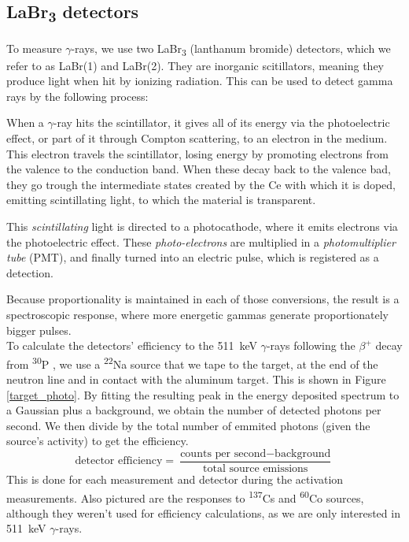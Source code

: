 \documentclass[a4paper,12pt]{report}
\newcommand{\Piso}{\textsuperscript{30}P }
\newcommand{\Na}{\textsuperscript{22}Na }
\begin{document}
\subsection{LaBr\textsubscript{3} detectors}
To measure $\gamma$-rays, we use two LaBr\textsubscript{3} (lanthanum bromide) detectors, which we refer to as LaBr(1) and LaBr(2).
They are inorganic scitillators, meaning they produce light when hit by ionizing radiation.
This can be used to detect gamma rays by the following process:

When a $\gamma$-ray hits the scintillator, it gives all of its energy via the photoelectric effect, or part of it through Compton scattering, to an electron in the medium.
This electron travels the scintillator, losing energy by promoting electrons from the valence to the conduction band.
When these decay back to the valence bad, they go trough the intermediate states created by the Ce with which it is doped, emitting scintillating light, to which the material is transparent.

This \textit{scintillating} light is directed to a photocathode, where it emits electrons via the photoelectric effect.
These \textit{photo-electrons} are multiplied in a \textit{photomultiplier tube} (PMT), and finally turned into an electric pulse, which is registered as a detection.

Because proportionality is maintained in each of those conversions, the result is a spectroscopic response, where more energetic gammas generate proportionately bigger pulses.\cite{labr}
\\

To calculate the detectors' efficiency to the \qty{511}{\keV} $\gamma$-rays following the $\beta^+$ decay from \Piso, we use a \Na source that we tape to the target, at the end of the neutron line and in contact with the aluminum target.
This is shown in Figure \ref{target_photo}.
By fitting the resulting peak in the energy deposited spectrum to a Gaussian plus a background, we obtain the number of detected photons per second.
We then divide by the total number of emmited photons (given the source's activity) to get the efficiency.
\begin{equation}
	\text{detector efficiency} = \frac{\text{counts per second}-\text{background}}{\text{total source emissions}}
\end{equation}
This is done for each measurement and detector during the activation measurements.
Also pictured are the responses to \textsuperscript{137}Cs and \textsuperscript{60}Co sources, although they weren't used for efficiency calculations, as we are only interested in \qty{511}{\keV} $\gamma$-rays.
\end{document}
